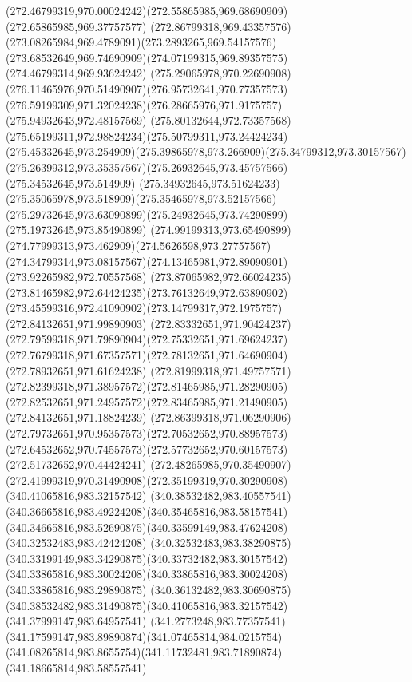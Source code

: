 {    \curveto(272.46799319,970.00024242)(272.55865985,969.68690909)(272.65865985,969.37757577)
    \curveto(272.86799318,969.43357576)(273.08265984,969.4789091)(273.2893265,969.54157576)
    \curveto(273.68532649,969.74690909)(274.07199315,969.89357575)(274.46799314,969.93624242)
    \curveto(275.29065978,970.22690908)(276.11465976,970.51490907)(276.95732641,970.77357573)
    \curveto(276.59199309,971.32024238)(276.28665976,971.9175757)(275.94932643,972.48157569)
    \curveto(275.80132644,972.73357568)(275.65199311,972.98824234)(275.50799311,973.24424234)
    \curveto(275.45332645,973.254909)(275.39865978,973.266909)(275.34799312,973.30157567)
    \curveto(275.26399312,973.35357567)(275.26932645,973.45757566)(275.34532645,973.514909)
    \curveto(275.34932645,973.51624233)(275.35065978,973.518909)(275.35465978,973.52157566)
    \curveto(275.29732645,973.63090899)(275.24932645,973.74290899)(275.19732645,973.85490899)
    \curveto(274.99199313,973.65490899)(274.77999313,973.462909)(274.5626598,973.27757567)
    \curveto(274.34799314,973.08157567)(274.13465981,972.89090901)(273.92265982,972.70557568)
    \curveto(273.87065982,972.66024235)(273.81465982,972.64424235)(273.76132649,972.63890902)
    \curveto(273.45599316,972.41090902)(273.14799317,972.1975757)(272.84132651,971.99890903)
    \curveto(272.83332651,971.90424237)(272.79599318,971.79890904)(272.75332651,971.69624237)
    \curveto(272.76799318,971.67357571)(272.78132651,971.64690904)(272.78932651,971.61624238)
    \curveto(272.81999318,971.49757571)(272.82399318,971.38957572)(272.81465985,971.28290905)
    \curveto(272.82532651,971.24957572)(272.83465985,971.21490905)(272.84132651,971.18824239)
    \curveto(272.86399318,971.06290906)(272.79732651,970.95357573)(272.70532652,970.88957573)
    \curveto(272.64532652,970.74557573)(272.57732652,970.60157573)(272.51732652,970.44424241)
    \curveto(272.48265985,970.35490907)(272.41999319,970.31490908)(272.35199319,970.30290908)
    \moveto(340.41065816,983.32157542)
    \curveto(340.38532482,983.40557541)(340.36665816,983.49224208)(340.35465816,983.58157541)
    \curveto(340.34665816,983.52690875)(340.33599149,983.47624208)(340.32532483,983.42424208)
    \curveto(340.32532483,983.38290875)(340.33199149,983.34290875)(340.33732482,983.30157542)
    \curveto(340.33865816,983.30024208)(340.33865816,983.30024208)(340.33865816,983.29890875)
    \curveto(340.36132482,983.30690875)(340.38532482,983.31490875)(340.41065816,983.32157542)
    \moveto(341.37999147,983.64957541)
    \curveto(341.2773248,983.77357541)(341.17599147,983.89890874)(341.07465814,984.0215754)
    \curveto(341.08265814,983.8655754)(341.11732481,983.71890874)(341.18665814,983.58557541)
}
